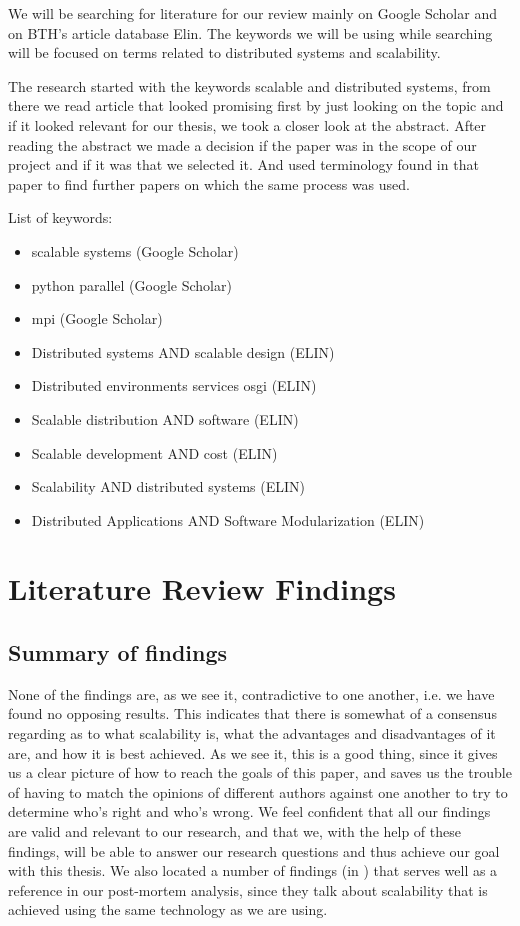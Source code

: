 \documentclass{article}
\begin{document}
We will be searching for literature for our review mainly on Google Scholar and
on BTH's article database Elin. The keywords we will be using while searching 
will be focused on terms related to distributed systems and scalability.

The research started with the keywords scalable and distributed systems,
from there we read article that looked promising first by just looking on
the topic and if it looked relevant for our thesis, we took a closer look
at the abstract. After reading the abstract we made a decision if the paper
was in the scope of our project and if it was that we selected it. And used
terminology found in that paper to find further papers on which the same 
process was used. 
\newline

List of keywords:
\begin{itemize}
\item{scalable systems (Google Scholar)}
\item{python parallel (Google Scholar)}
\item{mpi (Google Scholar)}
\item{Distributed systems AND scalable design (ELIN)}
\item{Distributed environments services osgi (ELIN)}
\item{Scalable distribution AND software (ELIN)}
\item{Scalable development AND cost (ELIN)}
\item{Scalability AND distributed systems (ELIN)}
\item{Distributed Applications AND Software Modularization (ELIN)}
\end{itemize}

\section{Literature Review Findings}

\subsection{Summary of findings}

None of the findings are, as we see it, contradictive to one another, i.e. we
have found no opposing results.  This indicates that there is somewhat of a
consensus regarding as to what scalability is, what the advantages and
disadvantages of it are, and how it is best achieved. As we see it, this is a
good thing, since it gives us a clear picture of how to reach the goals of this
paper, and saves us the trouble of having to match the opinions of different
authors against one another to try to determine who's right and who's wrong.
We feel confident that all our findings are valid and relevant to our research,
and that we, with the help of these findings, will be able to answer our
research questions and thus achieve our goal with this thesis.
We also located a number of findings
(in \cite{gropp1996high}\cite{miller2002pympi}\cite{millerparallel}) that
serves well as a reference in our post-mortem analysis, since they talk about
scalability that is achieved using the same technology as we are using.
\end{document}
